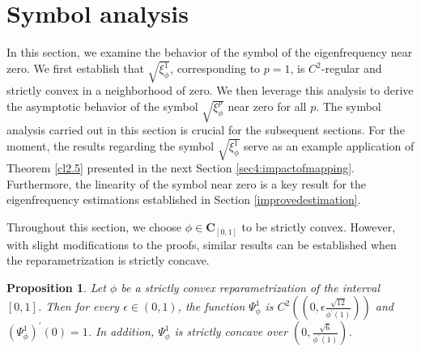 \documentclass[11pt]{article}
\newtheorem{proposition}{Proposition}[section]
\begin{document}




\section{Symbol analysis}\label{sec3:symbolanalysis}
In this section, we examine the behavior of the symbol of the eigenfrequency near zero. We first establish that $\sqrt{\xi_{\phi}^1}$, corresponding to $p=1$, is $C^2$-regular and strictly convex in a neighborhood of zero. We then leverage this analysis to derive the asymptotic behavior of the symbol $\sqrt{\xi_{\phi}^p}$ near zero for all $p$. The symbol analysis carried out in this section is crucial for the subsequent sections. For the moment, the results regarding the symbol $\sqrt{\xi_{\phi}^1}$ serve as an example application of Theorem \ref{cl2.5} presented in the next Section \ref{sec4:impactofmapping}. Furthermore, the linearity of the symbol near zero is a key result for the eigenfrequency estimations established in Section \ref{improvedestimation}.

Throughout this section, we choose $\phi\in\mathbf{C}_{[0,1]}$ to be strictly convex. However, with slight modifications to the proofs, similar results can be established when the reparametrization is strictly concave.




\begin{proposition}\label{propc}
Let $\phi$ be a strictly convex reparametrization of the interval $[0,1]$. Then for every $\epsilon\in(0,1)$, the function $\Psi_{\phi}^{1}$ is $C^{2}\left(\left(0,\epsilon\frac{\sqrt{12}}{\phi^{'}(1)}  \right) \right)$ and \\ $\left(\Psi_{\phi}^{1}\right)^{'}(0)=1$. In addition, $\Psi_{\phi}^{1}$ is strictly concave over $\left(0,\frac{\sqrt{6}}{\phi^{'}(1)}\right)$.
\end{proposition}
\end{document}
